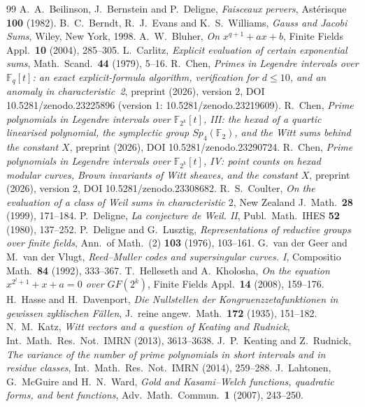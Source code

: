 \documentclass[11pt,a4paper]{amsart}
\theoremstyle{definition}
\newcommand{\F}{\mathbb{F}}
\begin{document}
\clearpage
\begin{thebibliography}{99}
 A.~A.~Beilinson, J.~Bernstein and P.~Deligne, \emph{Faisceaux pervers}, Ast\'erisque \textbf{100} (1982).
 B.~C.~Berndt, R.~J.~Evans and K.~S.~Williams, \emph{Gauss and Jacobi Sums}, Wiley, New York, 1998.
 A.~W.~Bluher, \emph{On $x^{q+1}+ax+b$}, Finite Fields Appl.\ \textbf{10} (2004), 285--305.
 L.~Carlitz, \emph{Explicit evaluation of certain exponential sums}, Math.\ Scand.\ \textbf{44} (1979), 5--16.
 R.~Chen, \emph{Primes in Legendre intervals over $\F_q[t]$: an exact explicit-formula algorithm, verification for $d\le10$, and an anomaly in characteristic~2}, preprint (2026), version 2, DOI 10.5281/zenodo.23225896 (version 1: 10.5281/zenodo.23219609).
 R.~Chen, \emph{Prime polynomials in Legendre intervals over $\F_{2^k}[t]$, III: the hexad of a quartic linearised polynomial, the symplectic group $Sp_4(\F_2)$, and the Witt sums behind the constant $X$}, preprint (2026), DOI 10.5281/zenodo.23290724.
 R.~Chen, \emph{Prime polynomials in Legendre intervals over $\F_{2^k}[t]$, IV: point counts on hexad modular curves, Brown invariants of Witt sheaves, and the constant $X$}, preprint (2026), version 2, DOI 10.5281/zenodo.23308682.
 R.~S.~Coulter, \emph{On the evaluation of a class of Weil sums in characteristic $2$}, New Zealand J.\ Math.\ \textbf{28} (1999), 171--184.
 P.~Deligne, \emph{La conjecture de Weil. II}, Publ.\ Math.\ IHES \textbf{52} (1980), 137--252.
 P.~Deligne and G.~Lusztig, \emph{Representations of reductive groups over finite fields}, Ann.\ of Math.\ (2) \textbf{103} (1976), 103--161.
 G.~van der Geer and M.~van der Vlugt, \emph{Reed--Muller codes and supersingular curves. I}, Compositio Math.\ \textbf{84} (1992), 333--367.
 T.~Helleseth and A.~Kholosha, \emph{On the equation $x^{2^l+1}+x+a=0$ over $GF(2^k)$}, Finite Fields Appl.\ \textbf{14} (2008), 159--176.
 H.~Hasse and H.~Davenport, \emph{Die Nullstellen der Kongruenzzetafunktionen in gewissen zyklischen F\"allen}, J.\ reine angew.\ Math.\ \textbf{172} (1935), 151--182.
 N.~M.~Katz, \emph{Witt vectors and a question of Keating and Rudnick}, Int.\ Math.\ Res.\ Not.\ IMRN (2013), 3613--3638.
 J.~P.~Keating and Z.~Rudnick, \emph{The variance of the number of prime polynomials in short intervals and in residue classes}, Int.\ Math.\ Res.\ Not.\ IMRN (2014), 259--288.
 J.~Lahtonen, G.~McGuire and H.~N.~Ward, \emph{Gold and Kasami--Welch functions, quadratic forms, and bent functions}, Adv.\ Math.\ Commun.\ \textbf{1} (2007), 243--250.
\end{thebibliography}
\end{document}
